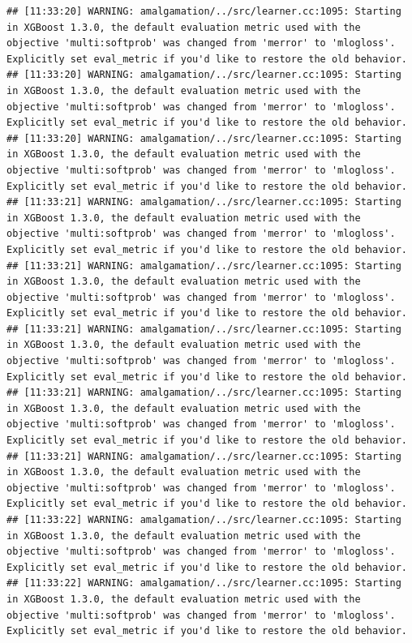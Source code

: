 \documentclass[
]{scrbook}
\begin{document}
\begin{verbatim}
## [11:33:20] WARNING: amalgamation/../src/learner.cc:1095: Starting in XGBoost 1.3.0, the default evaluation metric used with the objective 'multi:softprob' was changed from 'merror' to 'mlogloss'. Explicitly set eval_metric if you'd like to restore the old behavior.
## [11:33:20] WARNING: amalgamation/../src/learner.cc:1095: Starting in XGBoost 1.3.0, the default evaluation metric used with the objective 'multi:softprob' was changed from 'merror' to 'mlogloss'. Explicitly set eval_metric if you'd like to restore the old behavior.
## [11:33:20] WARNING: amalgamation/../src/learner.cc:1095: Starting in XGBoost 1.3.0, the default evaluation metric used with the objective 'multi:softprob' was changed from 'merror' to 'mlogloss'. Explicitly set eval_metric if you'd like to restore the old behavior.
## [11:33:21] WARNING: amalgamation/../src/learner.cc:1095: Starting in XGBoost 1.3.0, the default evaluation metric used with the objective 'multi:softprob' was changed from 'merror' to 'mlogloss'. Explicitly set eval_metric if you'd like to restore the old behavior.
## [11:33:21] WARNING: amalgamation/../src/learner.cc:1095: Starting in XGBoost 1.3.0, the default evaluation metric used with the objective 'multi:softprob' was changed from 'merror' to 'mlogloss'. Explicitly set eval_metric if you'd like to restore the old behavior.
## [11:33:21] WARNING: amalgamation/../src/learner.cc:1095: Starting in XGBoost 1.3.0, the default evaluation metric used with the objective 'multi:softprob' was changed from 'merror' to 'mlogloss'. Explicitly set eval_metric if you'd like to restore the old behavior.
## [11:33:21] WARNING: amalgamation/../src/learner.cc:1095: Starting in XGBoost 1.3.0, the default evaluation metric used with the objective 'multi:softprob' was changed from 'merror' to 'mlogloss'. Explicitly set eval_metric if you'd like to restore the old behavior.
## [11:33:21] WARNING: amalgamation/../src/learner.cc:1095: Starting in XGBoost 1.3.0, the default evaluation metric used with the objective 'multi:softprob' was changed from 'merror' to 'mlogloss'. Explicitly set eval_metric if you'd like to restore the old behavior.
## [11:33:22] WARNING: amalgamation/../src/learner.cc:1095: Starting in XGBoost 1.3.0, the default evaluation metric used with the objective 'multi:softprob' was changed from 'merror' to 'mlogloss'. Explicitly set eval_metric if you'd like to restore the old behavior.
## [11:33:22] WARNING: amalgamation/../src/learner.cc:1095: Starting in XGBoost 1.3.0, the default evaluation metric used with the objective 'multi:softprob' was changed from 'merror' to 'mlogloss'. Explicitly set eval_metric if you'd like to restore the old behavior.

\end{verbatim}
\end{document}

